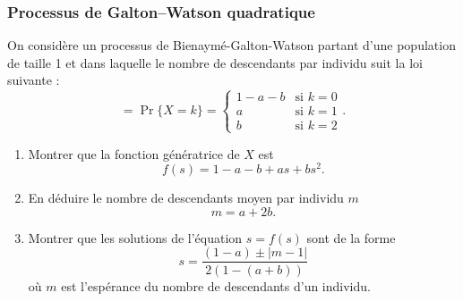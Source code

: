\subsubsection{Processus de Galton–Watson quadratique \todo{}} %
  On considère un processus de Bienaymé-Galton-Watson partant d'une population de taille 1 et dans laquelle le nombre de descendants par individu suit la loi suivante :
  $$=
  \Pr\{X = k\} = \left\{
    \begin{array}{ll}
      1 - a - b & \text{si $k = 0$} \\
      a & \text{si $k = 1$} \\
      b & \text{si $k = 2$}
    \end{array}\right..
  $$
  \begin{enumerate}
    \item Montrer que la fonction génératrice de $X$ est
    $$
    f(s) = 1 - a - b + as + bs^2.
    $$
    \solution{\todo{}}
    \item En déduire le nombre de descendants moyen par individu $m$
    $$
    m = a + 2b.
    $$
    \item Montrer que les solutions de l'équation $s = f(s)$ sont de la forme
    $$
    s = \frac{(1-a) \pm |m-1|}{2(1 -(a+b))}
    $$
    où $m$ est l'espérance du nombre de descendants d'un individu.
  \end{enumerate}
